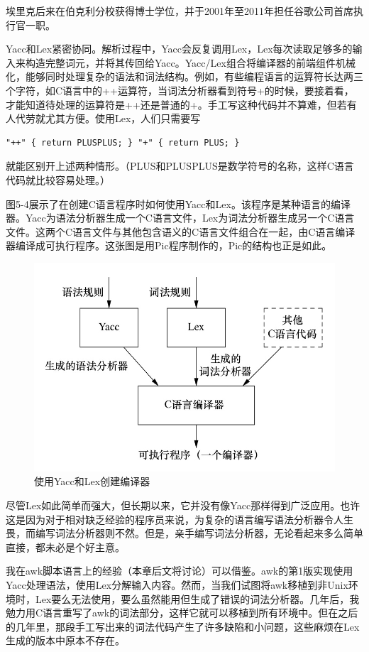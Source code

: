 \documentclass[a4paper,12pt,UTF8,twoside]{ctexbook}
\begin{document}
埃里克后来在伯克利分校获得博士学位，并于2001年至2011年担任谷歌公司首席执行官一职。

Yacc和Lex紧密协同。解析过程中，Yacc会反复调用Lex，Lex每次读取足够多的输入来构造完整词元，并将其传回给Yacc。Yacc/Lex组合将编译器的前端组件机械化，能够同时处理复杂的语法和词法结构。例如，有些编程语言的运算符长达两三个字符，如C语言中的++运算符，当词法分析器看到符号+的时候，要接着看，才能知道待处理的运算符是++还是普通的+。手工写这种代码并不算难，但若有人代劳就尤其方便。使用Lex，人们只需要写

\begin{lstlisting}
"++" { return PLUSPLUS; } "+" { return PLUS; }
\end{lstlisting}

就能区别开上述两种情形。（PLUS和PLUSPLUS是数学符号的名称，这样C语言代码就比较容易处理。）

图5-4展示了在创建C语言程序时如何使用Yacc和Lex。该程序是某种语言的编译器。Yacc为语法分析器生成一个C语言文件，Lex为词法分析器生成另一个C语言文件。这两个C语言文件与其他包含语义的C语言文件组合在一起，由C语言编译器编译成可执行程序。这张图是用Pic程序制作的，Pic的结构也正是如此。

\begin{figure}[htbp]
	\centering
	\includegraphics[width=0.7\linewidth]{43}
	\caption{使用Yacc和Lex创建编译器}
	\label{fig:1}
\end{figure}

尽管Lex如此简单而强大，但长期以来，它并没有像Yacc那样得到广泛应用。也许这是因为对于相对缺乏经验的程序员来说，为复杂的语言编写语法分析器令人生畏，而编写词法分析器则不然。但是，亲手编写词法分析器，无论看起来多么简单直接，都未必是个好主意。

我在awk脚本语言上的经验（本章后文将讨论）可以借鉴。awk的第1版实现使用Yacc处理语法，使用Lex分解输入内容。然而，当我们试图将awk移植到非Unix环境时，Lex要么无法使用，要么虽然能用但生成了错误的词法分析器。几年后，我勉力用C语言重写了awk的词法部分，这样它就可以移植到所有环境中。但在之后的几年里，那段手工写出来的词法代码产生了许多缺陷和小问题，这些麻烦在Lex生成的版本中原本不存在。
\end{document}
